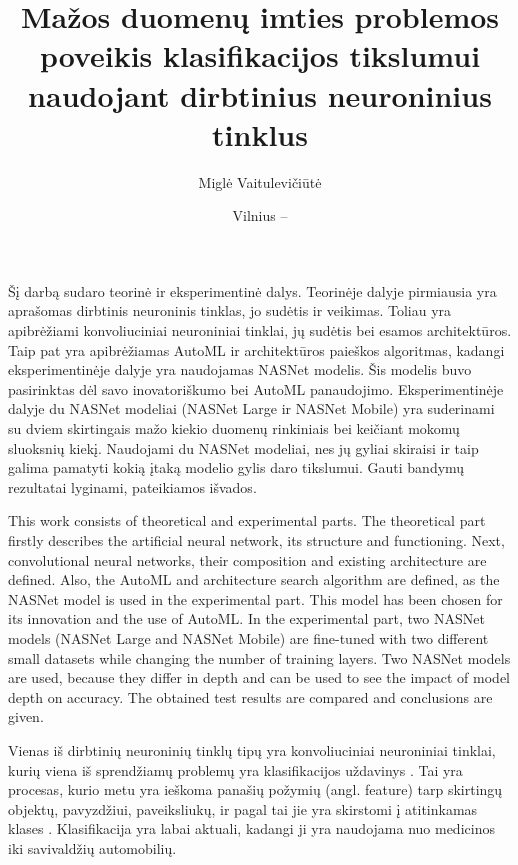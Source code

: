 \documentclass{VUMIFPSbakalaurinis}
\title{Mažos duomenų imties problemos poveikis klasifikacijos tikslumui naudojant dirbtinius neuroninius tinklus}
\author{Miglė Vaitulevičiūtė}
\date{Vilnius – \the\year}
\begin{document}
\maketitle
\cleardoublepage{}
\setcounter{page}{2}
\tableofcontents

Šį darbą sudaro teorinė ir eksperimentinė dalys. Teorinėje dalyje pirmiausia yra aprašomas dirbtinis neuroninis tinklas, jo sudėtis ir veikimas. Toliau yra apibrėžiami konvoliuciniai neuroniniai tinklai, jų sudėtis bei esamos architektūros. Taip pat yra apibrėžiamas AutoML ir architektūros paieškos algoritmas, kadangi eksperimentinėje dalyje yra naudojamas NASNet modelis. Šis modelis buvo pasirinktas dėl savo inovatoriškumo bei AutoML panaudojimo. 
Eksperimentinėje dalyje du NASNet modeliai (NASNet Large ir NASNet Mobile) yra suderinami su dviem skirtingais mažo kiekio duomenų rinkiniais bei keičiant mokomų sluoksnių kiekį. Naudojami du NASNet modeliai, nes jų gyliai skiraisi ir taip galima pamatyti kokią įtaką modelio gylis daro tikslumui. Gauti bandymų rezultatai lyginami, pateikiamos išvados.


This work consists of theoretical and experimental parts.  The theoretical part firstly describes the artificial neural network, its structure and functioning. Next, convolutional neural networks, their composition and existing architecture are defined. Also, the AutoML and architecture search algorithm are defined, as the NASNet model is used in the experimental part. This model has been chosen for its innovation and the use of AutoML.
In the experimental part, two NASNet models (NASNet Large and NASNet Mobile) are fine-tuned with two different small datasets while changing the number of training layers. Two NASNet models are used, because they differ in depth and can be used to see the impact of model depth on accuracy. The obtained test results are compared and conclusions are given.



Vienas iš dirbtinių neuroninių tinklų tipų yra konvoliuciniai neuroniniai tinklai, kurių viena iš sprendžiamų problemų yra klasifikacijos uždavinys \cite{fukushima, LeCun:1999:ORG:646469.691875}. 
Tai yra procesas, kurio metu yra ieškoma panašių požymių (angl. feature) tarp skirtingų objektų, pavyzdžiui, 
paveiksliukų, ir pagal tai jie yra skirstomi į atitinkamas klases \cite{classificationDef}. Klasifikacija yra labai aktuali, kadangi ji yra naudojama 
nuo medicinos iki savivaldžių automobilių. 
\end{document}

